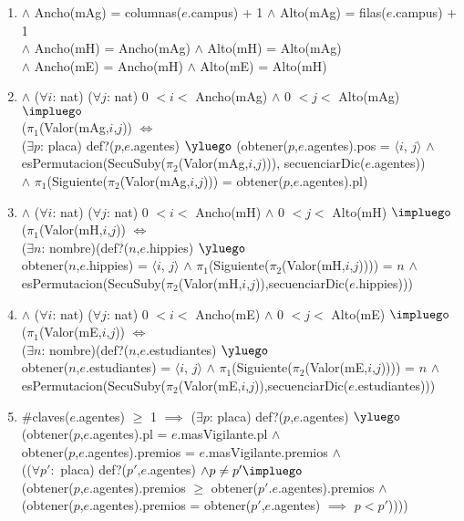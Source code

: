 \begin{Representacion}
{\begin{enumerate}
		\item $\land$ Ancho(mAg) = columnas($e$.campus) + 1 $\land$ Alto(mAg) = filas($e$.campus) + 1 \\
		$\land$ Ancho(mH) = Ancho(mAg) $\land$ Alto(mH) = Alto(mAg)\\
		$\land$ Ancho(mE) = Ancho(mH) $\land$ Alto(mE) = Alto(mH)
		\item $\land$ ($\forall i$: nat) ($\forall j$: nat) 0 $< i <$ Ancho(mAg) $\land$ 0 $< j <$ Alto(mAg) $\impluego$ \\
		($\pi_1$(Valor(mAg,$i$,$j$)) $\iff$ \\
		($\exists p$: placa) def?($p$,$e$.agentes) $\yluego$ (obtener($p$,$e$.agentes).pos = $\langle i$, $j \rangle$ $\land$ \\ 
		esPermutacion(SecuSuby($\pi_2$(Valor(mAg,$i$,$j$))), secuenciarDic($e$.agentes)) \\
		$\land$ $\pi_1$(Siguiente($\pi_2$(Valor(mAg,$i$,$j$))) = obtener($p$,$e$.agentes).pl)
		\item $\land$ ($\forall i$: nat) ($\forall j$: nat) 0 $< i <$ Ancho(mH) $\land$ 0 $< j <$ Alto(mH) $\impluego$ \\
		($\pi_1$(Valor(mH,$i$,$j$)) $\iff$ \\
		($\exists n$: nombre)(def?($n$,$e$.hippies) $\yluego$ \\
		obtener($n$,$e$.hippies) = $\langle i$, $j \rangle$ $\land$ $\pi_1$(Siguiente($\pi_2$(Valor(mH,$i$,$j$)))) = $n$ $\land$ \\
		esPermutacion(SecuSuby($\pi_2$(Valor(mH,$i$,$j$)),secuenciarDic($e$.hippies)))
		\item $\land$ ($\forall i$: nat) ($\forall j$: nat) 0 $< i <$ Ancho(mE) $\land$ 0 $< j <$ Alto(mE) $\impluego$ \\
		($\pi_1$(Valor(mE,$i$,$j$)) $\iff$ \\
		($\exists n$: nombre)(def?($n$,$e$.estudiantes) $\yluego$ \\
		obtener($n$,$e$.estudiantes) = $\langle i$, $j \rangle$ $\land$ $\pi_1$(Siguiente($\pi_2$(Valor(mE,$i$,$j$)))) = $n$ $\land$ \\
		esPermutacion(SecuSuby($\pi_2$(Valor(mE,$i$,$j$)),secuenciarDic($e$.estudiantes)))
		\item $\#$claves($e$.agentes) $\geq$ 1 $\implies$ ($\exists p$: placa) def?($p$,$e$.agentes) $\yluego$ \\
		(obtener($p$,$e$.agentes).pl = $e$.masVigilante.pl $\land$ \\
		obtener($p$,$e$.agentes).premios = $e$.masVigilante.premios $\land$ \\
		(($\forall p':$ placa) def?($p'$,$e$.agentes) $\land p \neq p' \impluego$\\
		(obtener($p$,$e$.agentes).premios $\geq$ obtener($p'$.$e$.agentes).premios $\land$ \\
		(obtener($p$,$e$.agentes).premios = obtener($p'$,$e$.agentes) $\implies$ $p < p'$))))


\end{enumerate}}
\end{Representacion}
